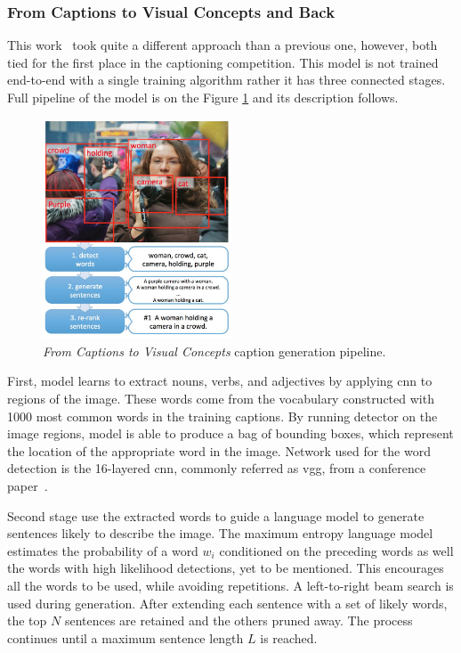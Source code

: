 \subsubsection{From Captions to Visual Concepts and Back} \label{subsubsec:fromCaptions}

This work~\cite{DBLP:journals/corr/FangGISDDGHMPZZ14} took quite a different approach than a previous one, however, both tied for the first place in the captioning competition. This model is not trained end-to-end with a single training algorithm rather it has three connected stages. Full pipeline of the model is on the Figure \ref{fig:fromCaptionsModel} and its description follows.

\begin{figure}[!t]
	\centering
	\includegraphics[width=0.5\textwidth]{./fig/from-captions-workflow.png}
	\caption{\emph{From Captions to Visual Concepts} caption generation pipeline.~\cite{DBLP:journals/corr/FangGISDDGHMPZZ14}
		\label{fig:fromCaptionsModel}}
\end{figure}

First, model learns to extract nouns, verbs, and adjectives by applying \gls{cnn} to regions of the image. These words come from the vocabulary constructed with 1000 most common words in the training captions. By running detector on the image regions, model is able to produce a bag of bounding boxes, which represent the location of the appropriate word in the image. Network used for the word detection is the 16-layered \gls{cnn}, commonly referred as \gls{vgg}, from a conference paper~\cite{DBLP:journals/corr/SimonyanZ14a}.

Second stage use the extracted words to guide a language model to generate sentences likely  to describe the image. The maximum entropy language model estimates the probability of a word $ w_i $ conditioned on the preceding words as well the words with high likelihood detections, yet to be mentioned. This encourages all the words to be used, while avoiding repetitions. A left-to-right beam search is used during generation. After extending each sentence with a set of likely words, the top $ N $  sentences are retained and the others pruned away. The process continues until a maximum sentence length $ L $ is reached.

